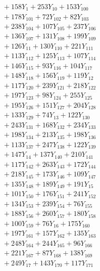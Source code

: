 \documentclass[a4paper,10pt]{article}
\begin{document}
{\begin{align}
&\quad  + 158Y_{1} + 253Y_{10} + 153Y_{100} \\[0.5ex]
&\quad  + 178Y_{101} + 72Y_{102} + 82Y_{103} \\[0.5ex]
&\quad  + 238Y_{104} + 107Y_{105} + 237Y_{106} \\[0.5ex]
&\quad  + 136Y_{107} + 131Y_{108} + 199Y_{109} \\[0.5ex]
&\quad  + 126Y_{11} + 130Y_{110} + 221Y_{111} \\[0.5ex]
&\quad  + 113Y_{112} + 125Y_{113} + 107Y_{114} \\[0.5ex]
&\quad  + 146Y_{115} + 93Y_{116} + 104Y_{117} \\[0.5ex]
&\quad  + 148Y_{118} + 156Y_{119} + 119Y_{12} \\[0.5ex]
&\quad  + 117Y_{120} + 239Y_{121} + 218Y_{122} \\[0.5ex]
&\quad  + 197Y_{123} + 98Y_{124} + 255Y_{125} \\[0.5ex]
&\quad  + 195Y_{126} + 151Y_{127} + 204Y_{128} \\[0.5ex]
&\quad  + 133Y_{129} + 74Y_{13} + 122Y_{130} \\[0.5ex]
&\quad  + 243Y_{131} + 168Y_{132} + 234Y_{133} \\[0.5ex]
&\quad  + 198Y_{134} + 213Y_{135} + 198Y_{136} \\[0.5ex]
&\quad  + 113Y_{137} + 247Y_{138} + 122Y_{139} \\[0.5ex]
&\quad  + 147Y_{14} + 137Y_{140} + 210Y_{141} \\[0.5ex]
&\quad  + 117Y_{142} + 263Y_{143} + 172Y_{144} \\[0.5ex]
&\quad  + 218Y_{145} + 173Y_{146} + 109Y_{147} \\[0.5ex]
&\quad  + 135Y_{148} + 189Y_{149} + 191Y_{15} \\[0.5ex]
&\quad  + 101Y_{150} + 176Y_{151} + 241Y_{152} \\[0.5ex]
&\quad  + 134Y_{153} + 239Y_{154} + 76Y_{155} \\[0.5ex]
&\quad  + 188Y_{156} + 260Y_{157} + 180Y_{158} \\[0.5ex]
&\quad  + 100Y_{159} + 76Y_{16} + 175Y_{160} \\[0.5ex]
&\quad  + 197Y_{161} + 157Y_{162} + 135Y_{163} \\[0.5ex]
&\quad  + 248Y_{164} + 244Y_{165} + 96Y_{166} \\[0.5ex]
&\quad  + 221Y_{167} + 87Y_{168} + 138Y_{169} \\[0.5ex]
&\quad  + 249Y_{17} + 143Y_{170} + 117Y_{171} \\[0.5ex]

\end{align}}
\end{document}
